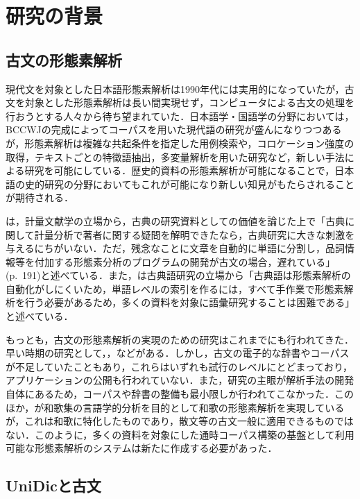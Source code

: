 \documentclass[japanese]{jnlp_1.4}
\begin{document}
\section{研究の背景}

\subsection{古文の形態素解析}

現代文を対象とした日本語形態素解析は1990年代には実用的になっていたが，古文を対象とした形態素解析は長い間実現せず，コンピュータによる古文の処理を行おうとする人々から待ち望まれていた．日本語学・国語学の分野においては，BCCWJの完成によってコーパスを用いた現代語の研究が盛んになりつつあるが，形態素解析は複雑な共起条件を指定した用例検索や，コロケーション強度の取得，テキストごとの特徴語抽出，多変量解析を用いた研究など，新しい手法による研究を可能にしている．歴史的資料の形態素解析が可能になることで，日本語の史的研究の分野においてもこれが可能になり新しい知見がもたらされることが期待される．

は，計量文献学の立場から，古典の研究資料としての価値を論じた上で「古典に関して計量分析で著者に関する疑問を解明できたなら，古典研究に大きな刺激を与えるにちがいない．ただ，残念なことに文章を自動的に単語に分割し，品詞情報等を付加する形態素分析のプログラムの開発が古文の場合，遅れている」(p.~191)と述べている．また，は古典語研究の立場から「古典語は形態素解析の自動化がしにくいため，単語レベルの索引を作るには，すべて手作業で形態素解析を行う必要があるため，多くの資料を対象に語彙研究することは困難である」と述べている．

もっとも，古文の形態素解析の実現のための研究はこれまでにも行われてきた．早い時期の研究として，，などがある．しかし，古文の電子的な辞書やコーパスが不足していたこともあり，これらはいずれも試行のレベルにとどまっており，アプリケーションの公開も行われていない．また，研究の主眼が解析手法の開発自体にあるため，コーパスや辞書の整備も最小限しか行われてこなかった．このほか，が和歌集の言語学的分析を目的として和歌の形態素解析を実現しているが，これは和歌に特化したものであり，散文等の古文一般に適用できるものではない．このように，多くの資料を対象にした通時コーパス構築の基盤として利用可能な形態素解析のシステムは新たに作成する必要があった．


\subsection{UniDicと古文}
\end{document}
